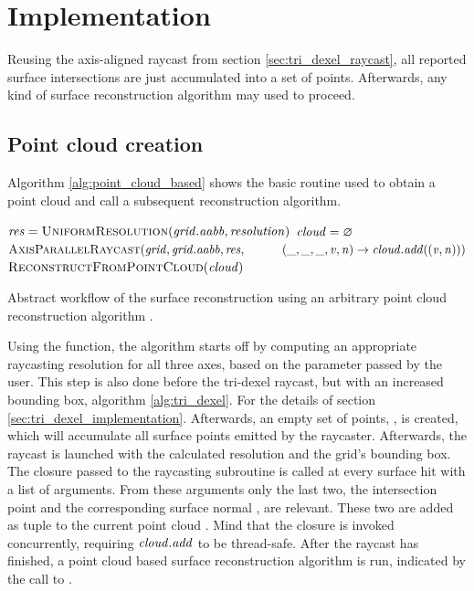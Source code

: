 \section{Implementation}
\label{sec:point_cloud_implementation}

Reusing the axis-aligned raycast from section \ref{sec:tri_dexel_raycast}, all reported surface intersections are just accumulated into a set of points.
Afterwards, any kind of surface reconstruction algorithm may used to proceed.

\subsection{Point cloud creation}
\label{sec:point_cloud_creation}

Algorithm \ref{alg:point_cloud_based} shows the basic routine used to obtain a point cloud and call a subsequent reconstruction algorithm.
%
\begin{algorithm}
	\centering
	\begin{algorithmic}[1]
			\State $\var{res} = \Call{UniformResolution}{\var{grid}.\var{aabb}, \var{resolution}}$
			\State $\mathit{cloud} = \varnothing$
			\State $\Call{AxisParallelRaycast}{\var{grid}, \var{grid}.\var{aabb}, \var{res},\hfill\break
				\hspace*{\dimexpr\algorithmicindent*2}(\var{\_}, \var{\_}, \var{\_}, \var{v}, \var{n}) \rightarrow \var{cloud}.\var{add}((\var{v}, \var{n}))}$
			\State \Return $\Call{ReconstructFromPointCloud}{\var{cloud}}$
		\EndFunction
	\end{algorithmic}
	\caption{
		Abstract workflow of the surface reconstruction using an arbitrary point cloud reconstruction algorithm .
	}
	\label{alg:point_cloud_based}
\end{algorithm}
%
Using the  function, the algorithm starts off by computing an appropriate raycasting resolution  for all three axes, based on the  parameter passed by the user.
This step is also done before the tri-dexel raycast, but with an increased bounding box, \cf algorithm \ref{alg:tri_dexel}.
For the details of  \cf section \ref{sec:tri_dexel_implementation}.
Afterwards, an empty set of points, , is created, which will accumulate all surface points emitted by the raycaster.
Afterwards, the raycast is launched with the calculated resolution and the grid's bounding box.
The closure passed to the raycasting subroutine  is called at every surface hit with a list of arguments.
From these arguments only the last two, the intersection point  and the corresponding surface normal , are relevant.
These two are added as tuple to the current point cloud .
Mind that the closure is invoked concurrently, requiring $\mathit{cloud}.\mathit{add}$ to be thread-safe.
After the raycast has finished, a point cloud based surface reconstruction algorithm is run, indicated by the call to .

